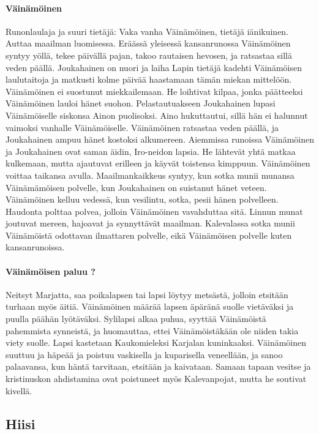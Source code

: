   \paragraph{Väinämöinen} Runonlaulaja ja suuri tietäjä: Vaka vanha Väinämöinen, tietäjä 
    iänikuinen. Auttaa maailman luomisessa. Eräässä yleisessä kansanrunossa Väinämöinen syntyy 
    yöllä, tekee päivällä pajan, takoo rautaisen hevosen, ja ratsastaa sillä veden päällä. 
    Joukahainen on nuori ja laiha Lapin tietäjä kadehti Väinämöisen laulutaitoja ja matkusti 
    kolme päivää haastamaan tämän miekan mittelöön. Väinämöinen ei suostunut miekkailemaan. He 
    loihtivat kilpaa, jonka päätteeksi Väinämöinen lauloi hänet suohon. Pelastautuakseen 
    Joukahainen lupasi Väinämöiselle siskonsa Ainon puolisoksi. Aino hukuttautui, sillä hän ei 
    halunnut vaimoksi vanhalle Väinämöiselle. Väinämöinen ratsastaa veden päällä, ja Joukahainen 
    ampuu hänet kostoksi alkumereen. Aiemmissa runoissa Väinämöinen ja Joukahainen ovat saman 
    äidin, Iro-neidon lapsia. He lähtevät yhtä matkaa kulkemaan, mutta ajautuvat erilleen ja 
    käyvät toistensa kimppuun. Väinämöinen voittaa taikansa avulla. Maailmankaikkeus syntyy, kun 
    sotka munii munansa Väinämämöisen polvelle, kun Joukahainen on suistanut hänet veteen. 
    Väinämöinen kelluu vedessä, kun vesilintu, sotka, pesii hänen polvelleen. Haudonta polttaa 
    polvea, jolloin Väinämöinen vavahduttaa sitä. Linnun munat joutuvat mereen, hajoavat ja 
    synnyttävät maailman. Kalevalassa sotka munii Väinämöistä odottavan ilmattaren polvelle, 
    eikä Väinämöisen polvelle kuten kansanrunoissa. 
  \paragraph{Väinämöisen paluu ?} Neitsyt Marjatta, saa poikalapsen tai lapsi löytyy metsästä, 
    jolloin etsitään turhaan myös äitiä. Väinämöinen määrää lapsen äpäränä suolle vietäväksi ja 
    puulla päähän lyötäväksi. Sylilapsi alkaa puhua, syyttää Väinämöistä pahemmista synneistä, 
    ja huomauttaa, ettei Väinämöistäkään ole niiden takia viety suolle. Lapsi kastetaan 
    Kaukomieleksi Karjalan kuninkaaksi. Väinämöinen suuttuu ja häpeää ja poistuu vaskisella ja 
    kuparisella veneellään, ja sanoo palaavansa, kun häntä tarvitaan, etsitään ja kaivataan. 
    Samaan tapaan vesitse ja kristinuskon ahdistamina ovat poistuneet myös Kalevanpojat, mutta 
    he soutivat kivellä.


\subsection{Hiisi} 

